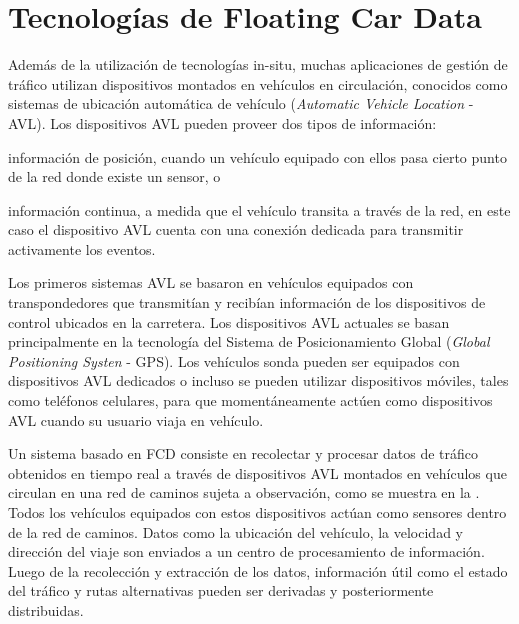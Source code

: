 \section{Tecnologías de Floating Car Data}

Además de la utilización de tecnologías in-situ, muchas aplicaciones de gestión de tráfico utilizan dispositivos montados en vehículos en circulación, conocidos como sistemas de ubicación automática de vehículo (\emph{Automatic Vehicle Location} - AVL). Los dispositivos AVL pueden proveer dos tipos de información: \begin{enumerate*}[a)]
\item información de posición, cuando un vehículo equipado con ellos pasa cierto punto de la red donde existe un sensor, o \item información continua, a medida que el vehículo transita a través de la red, en este caso el dispositivo AVL cuenta con una conexión dedicada para transmitir activamente los eventos.
\end{enumerate*}

Los primeros sistemas AVL se basaron en vehículos equipados con transpondedores que transmitían y recibían información de los dispositivos de control ubicados en la carretera. Los dispositivos AVL actuales se basan principalmente en la tecnología del Sistema de Posicionamiento Global (\emph{Global Positioning Systen} - GPS). Los vehículos sonda pueden ser equipados con dispositivos AVL dedicados o incluso se pueden utilizar dispositivos móviles, tales como teléfonos celulares, para que momentáneamente actúen como dispositivos AVL cuando su usuario viaja en vehículo.  

Un sistema basado en FCD consiste en recolectar y procesar datos de tráfico obtenidos en tiempo real a través de dispositivos AVL montados en vehículos que circulan en una red de caminos sujeta a observación, como se muestra en la . Todos los vehículos equipados con estos dispositivos actúan como sensores dentro de la red de caminos. Datos como la ubicación del vehículo, la velocidad y dirección del viaje son enviados a un centro de procesamiento de información. Luego de la recolección y extracción de los datos, información útil como el estado del tráfico y rutas alternativas pueden ser derivadas y posteriormente distribuidas.

